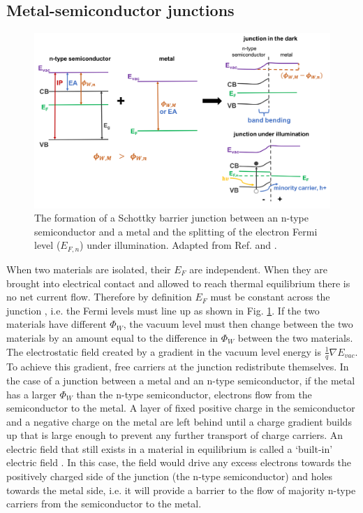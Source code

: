 \documentclass[11pt, twoside]{report}
\begin{document}
\subsection{Metal-semiconductor junctions}
\begin{figure}[h!]
  \centering
    \includegraphics[width=1.0\textwidth]{figures/schottky_schematic.png}
    \caption[The formation of a Schottky barrier junction between an n-type semiconductor and a metal and the splitting of the electron Fermi level ($E_{F,n}$) under illumination]{The formation of a Schottky barrier junction between an n-type semiconductor and a metal and the splitting of the electron Fermi level ($E_{F,n}$) under illumination. Adapted from Ref.  and .}
  \label{schottky_schematic}
\end{figure}

When two materials are isolated, their $E_F$ are independent. When they are brought into electrical contact and allowed to reach thermal equilibrium there is no net current flow. Therefore by definition $E_F$ must be constant across the junction \cite{PV_bands_book}, i.e. the Fermi levels must line up as shown in Fig. \ref{schottky_schematic}. 
If the two materials have different $\Phi_W$, the vacuum level must then change between the two materials by an amount equal to the difference in $\Phi_W$ between the two materials. The electrostatic field created by a gradient in the vacuum level energy is $\frac{1}{q} \nabla E_{vac}$.
To achieve this gradient, free carriers at the junction redistribute themselves. In the case of a junction between a metal and an n-type semiconductor, if the metal has a larger $\Phi_W$ than the n-type semiconductor, electrons flow from the semiconductor to the metal. A layer of fixed positive charge in the semiconductor and a negative charge on the metal are left behind until a charge gradient builds up that is large enough to prevent any further transport of charge carriers. An electric field that still exists in a material in equilibrium is called a `built-in' electric field \cite{Nelson5}. In this case, the field would drive any excess electrons towards the positively charged side of the junction (the n-type semiconductor) and holes towards the metal side, i.e. it will provide a barrier to the flow of majority n-type carriers from the semiconductor to the metal.
\end{document}
